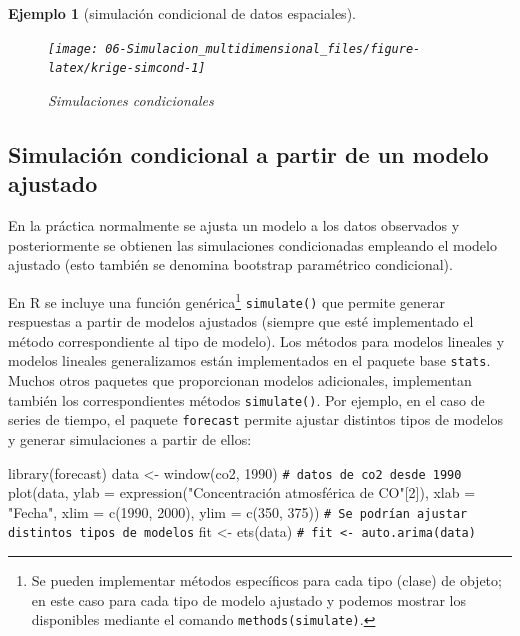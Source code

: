 \documentclass[
  10pt,
]{book}
\newenvironment{Shaded}{\begin{snugshade}}{\end{snugshade}}
\newcommand{\AttributeTok}[1]{\textcolor[rgb]{0.77,0.63,0.00}{#1}}
\newcommand{\CommentTok}[1]{\textcolor[rgb]{0.56,0.35,0.01}{\textit{#1}}}
\newcommand{\DecValTok}[1]{\textcolor[rgb]{0.00,0.00,0.81}{#1}}
\newcommand{\FunctionTok}[1]{\textcolor[rgb]{0.00,0.00,0.00}{#1}}
\newcommand{\NormalTok}[1]{#1}
\newcommand{\OtherTok}[1]{\textcolor[rgb]{0.56,0.35,0.01}{#1}}
\newcommand{\StringTok}[1]{\textcolor[rgb]{0.31,0.60,0.02}{#1}}
\theoremstyle{break}
\newtheorem{example}{Ejemplo}[chapter]
\theoremstyle{nonumberplain}
\renewcommand{\CommentTok}[1]{\textcolor[rgb]{0.41,0.41,0.41}{\texttt{#1}}}
\let\oldfootnote\footnote
\renewcommand\footnote[1]{\oldfootnote{\hspace{2mm}#1}}
\begin{document}
\begin{example}[simulación condicional de datos espaciales]
\begin{figure}[!htbp]

{\centering \texttt{[image: 06-Simulacion\_multidimensional\_files/figure-latex/krige-simcond-1]} 

}

\caption{Simulaciones condicionales}\label{fig:krige-simcond}
\end{figure}

\end{example}

\hypertarget{simulaciuxf3n-condicional-a-partir-de-un-modelo-ajustado}{%
\subsection{Simulación condicional a partir de un modelo ajustado}\label{simulaciuxf3n-condicional-a-partir-de-un-modelo-ajustado}}

En la práctica normalmente se ajusta un modelo a los datos observados y posteriormente se obtienen las simulaciones condicionadas empleando el modelo ajustado
(esto también se denomina bootstrap paramétrico condicional).

En R se incluye una función genérica\footnote{Se pueden implementar métodos específicos para cada tipo (clase) de objeto; en este caso para cada tipo de modelo ajustado y podemos mostrar los disponibles mediante el comando \texttt{methods(simulate)}.} \texttt{simulate()} que permite generar respuestas a partir de modelos ajustados (siempre que esté implementado el método correspondiente al tipo de modelo).
Los métodos para modelos lineales y modelos lineales generalizamos están implementados en el paquete base \texttt{stats}.
Muchos otros paquetes que proporcionan modelos adicionales, implementan también los correspondientes métodos \texttt{simulate()}.
Por ejemplo, en el caso de series de tiempo, el paquete \texttt{forecast} permite ajustar distintos tipos de modelos y generar simulaciones a partir de ellos:



\begin{Shaded}
\begin{Highlighting}[]
\FunctionTok{library}\NormalTok{(forecast)}
\NormalTok{data }\OtherTok{\textless{}{-}} \FunctionTok{window}\NormalTok{(co2, }\DecValTok{1990}\NormalTok{) }\CommentTok{\# datos de co2 desde 1990}
\FunctionTok{plot}\NormalTok{(data, }\AttributeTok{ylab =} \FunctionTok{expression}\NormalTok{(}\StringTok{"Concentración atmosférica de CO"}\NormalTok{[}\DecValTok{2}\NormalTok{]),}
     \AttributeTok{xlab =} \StringTok{"Fecha"}\NormalTok{, }\AttributeTok{xlim =} \FunctionTok{c}\NormalTok{(}\DecValTok{1990}\NormalTok{, }\DecValTok{2000}\NormalTok{), }\AttributeTok{ylim =} \FunctionTok{c}\NormalTok{(}\DecValTok{350}\NormalTok{, }\DecValTok{375}\NormalTok{))}
\CommentTok{\# Se podrían ajustar distintos tipos de modelos}
\NormalTok{fit }\OtherTok{\textless{}{-}} \FunctionTok{ets}\NormalTok{(data)}
\CommentTok{\# fit \textless{}{-} auto.arima(data)}
\end{Highlighting}
\end{Shaded}
\end{document}
